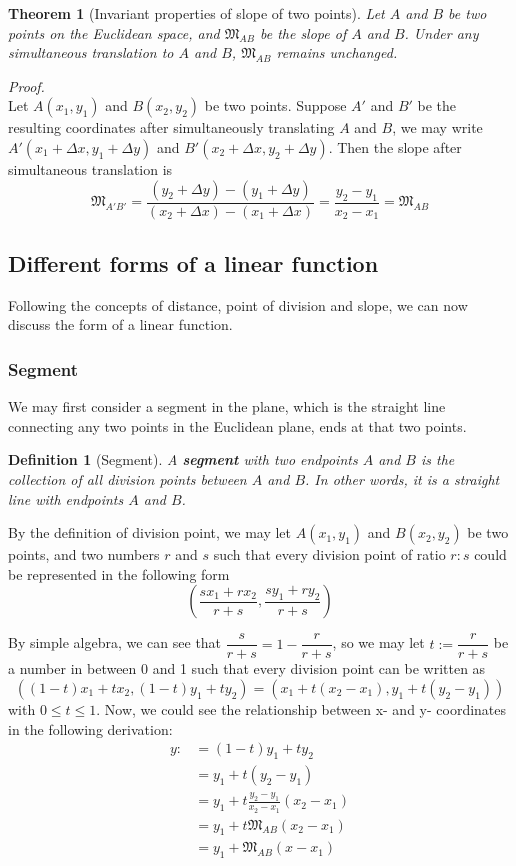 \documentclass[12pt]{article}
\newtheorem{definition}{Definition}[section]
\newtheorem*{theorem}{Theorem}
\renewenvironment{proof}[1][Proof]{\begin{snugshade*} \textit{{#1}.}\\}{\hfill \qedsymbol \end{snugshade*}}
\begin{document}
    \begin{theorem}[Invariant properties of slope of two points]
        Let $A$ and $B$ be two points on the Euclidean space, and $\mathfrak{M}_{AB}$ be the slope of $A$ and $B$. Under any simultaneous translation to $A$ and $B$, $\mathfrak{M}_{AB}$ remains unchanged.
    \end{theorem}

    \begin{proof}
        Let $A(x_1,y_1)$ and $B(x_2,y_2)$ be two points. Suppose $A'$ and $B'$ be the resulting coordinates after simultaneously translating $A$ and $B$, we may write $A'(x_1+\Delta x, y_1+\Delta y)$ and $B'(x_2+\Delta x, y_2+\Delta y)$. Then the slope after simultaneous translation is $$\mathfrak{M}_{A'B'}=\frac{(y_2+\Delta y)-(y_1+\Delta y)}{(x_2+\Delta x)-(x_1+\Delta x)}=\frac{y_2-y_1}{x_2-x_1}=\mathfrak{M}_{AB}$$
    \end{proof}

    \subsection{Different forms of a linear function}

    Following the concepts of distance, point of division and slope, we can now discuss the form of a linear function.

    \subsubsection*{Segment}

    We may first consider a segment in the plane, which is the straight line connecting any two points in the Euclidean plane, ends at that two points.

    \begin{definition}[Segment]
        A \textbf{segment} with two endpoints $A$ and $B$ is the collection of all division points between $A$ and $B$. In other words, it is a straight line with endpoints $A$ and $B$.
    \end{definition}

    By the definition of division point, we may let $A(x_1,y_1)$ and $B(x_2,y_2)$ be two points, and two numbers $r$ and $s$ such that every division point of ratio $r:s$ could be represented in the following form $$(\frac{sx_1+rx_2}{r+s},\frac{sy_1+ry_2}{r+s})$$

    By simple algebra, we can see that $\dfrac{s}{r+s}=1-\dfrac{r}{r+s}$, so we may let $t:=\dfrac{r}{r+s}$ be a number in between 0 and 1 such that every division point can be written as $$((1-t)x_1+tx_2, (1-t)y_1+ty_2)=(x_1+t(x_2-x_1),y_1+t(y_2-y_1))$$ with $0\leq t\leq 1$. Now, we could see the relationship between x- and y- coordinates in the following derivation:\begin{align*}
        y:&=(1-t)y_1+ty_2\\
        &=y_1+t(y_2-y_1)\\
        &=y_1+t\frac{y_2-y_1}{x_2-x_1}(x_2-x_1)\\
        &=y_1+t\mathfrak{M}_{AB}(x_2-x_1)\\
        &=y_1+\mathfrak{M}_{AB}(x-x_1)
    \end{align*}
\end{document}
